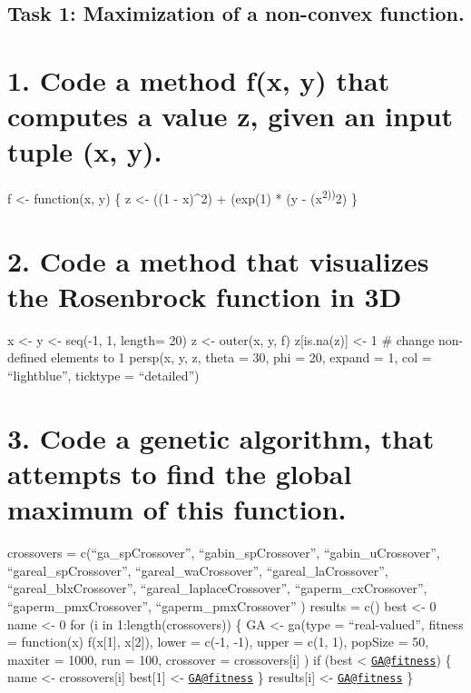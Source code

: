 \documentclass[]{article}
\begin{document}
\hypertarget{task-1-maximization-of-a-non-convex-function.}{%
\subsection{Task 1: Maximization of a non-convex
function.}\label{task-1-maximization-of-a-non-convex-function.}}

\hypertarget{code-a-method-fx-y-that-computes-a-value-z-given-an-input-tuple-x-y.}{%
\section{1. Code a method f(x, y) that computes a value z, given an
input tuple (x,
y).}\label{code-a-method-fx-y-that-computes-a-value-z-given-an-input-tuple-x-y.}}

f \textless{}- function(x, y) \{ z \textless{}- ((1 - x)\^{}2) + (exp(1)
* (y - (x\textsuperscript{2))}2) \}

\hypertarget{code-a-method-that-visualizes-the-rosenbrock-function-in-3d}{%
\section{2. Code a method that visualizes the Rosenbrock function in
3D}\label{code-a-method-that-visualizes-the-rosenbrock-function-in-3d}}

x \textless{}- y \textless{}- seq(-1, 1, length= 20) z \textless{}-
outer(x, y, f) z{[}is.na(z){]} \textless{}- 1 \# change non-defined
elements to 1 persp(x, y, z, theta = 30, phi = 20, expand = 1, col =
``lightblue'', ticktype = ``detailed'')

\hypertarget{code-a-genetic-algorithm-that-attempts-to-find-the-global-maximum-of-this-function.}{%
\section{3. Code a genetic algorithm, that attempts to find the global
maximum of this
function.}\label{code-a-genetic-algorithm-that-attempts-to-find-the-global-maximum-of-this-function.}}

crossovers = c(``ga\_spCrossover'', ``gabin\_spCrossover'',
``gabin\_uCrossover'', ``gareal\_spCrossover'', ``gareal\_waCrossover'',
``gareal\_laCrossover'', ``gareal\_blxCrossover'',
``gareal\_laplaceCrossover'', ``gaperm\_cxCrossover'',
``gaperm\_pmxCrossover'', ``gaperm\_pmxCrossover'' ) results = c() best
\textless{}- 0 name \textless{}- 0 for (i in 1:length(crossovers)) \{ GA
\textless{}- ga(type = ``real-valued'', fitness = function(x)
f(x{[}1{]}, x{[}2{]}), lower = c(-1, -1), upper = c(1, 1), popSize = 50,
maxiter = 1000, run = 100, crossover = crossovers{[}i{]} ) if (best
\textless{} \href{mailto:GA@fitness}{\nolinkurl{GA@fitness}}) \{ name
\textless{}- crossovers{[}i{]} best{[}1{]} \textless{}-
\href{mailto:GA@fitness}{\nolinkurl{GA@fitness}} \} results{[}i{]}
\textless{}- \href{mailto:GA@fitness}{\nolinkurl{GA@fitness}} \}
\end{document}

